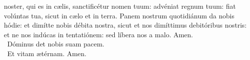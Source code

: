  noster, qui es in cælis, sanctificétur nomen tuum: advéniat regnum tuum: fiat volúntas tua, sicut in cælo et in terra. Panem nostrum quotidiánum da nobis hódie: et dimítte nobis débita nostra, sicut et nos dimíttimus debitóribus nostris: et ne nos indúcas in tentatiónem: sed líbera nos a malo. Amen.\\
~Dóminus det nobis suam pacem.\\
~Et vitam ætérnam. Amen.